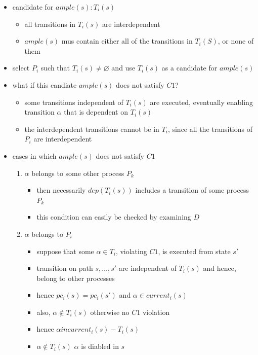 \documentclass[a4paper, 10pt]{article}
\begin{document}
\begin{itemize}
     \item candidate for $ample(s): T_i(s)$
    \begin{itemize}
        \item all transitions in $T_i(s)$ are interdependent
        \item $ample(s)$ mus contain either all of the transitions in $T_i(S)$, or none of them
    \end{itemize}
    \item select $P_i$ such that $T_i(s)\not=\varnothing$ and use $T_i(s)$ as a candidate for $ample(s)$
    \item what if this candiate $ample(s)$ does not satisfy $C1$?
    \begin{itemize}
        \item some transitions independent of $T_i(s)$ are executed, eventually enabling transition $\alpha$ that is dependent on $T_i(s)$
        \item the interdependent transitions cannot be in $T_i$, since all the transitions of $P_i$ are interdependent
    \end{itemize}
    \item cases in which $ample(s)$ does not satisfy $C1$
    \begin{enumerate}
        \item $\alpha$ belongs to some other process $P_k$
        \begin{itemize}
            \item then necessarily $dep(T_i(s))$ includes a transition of some process $P_k$
            \item this condition can easily be checked by examining $D$
        \end{itemize}
        \item $\alpha$ belongs to $P_i$
        \begin{itemize}
            \item suppose that some $\alpha\in T_i$, violating $C1$, is executed from state $s'$
            \item transition on path $s,\dots,s'$ are independent of $T_i(s)$ and hence, belong to other processes
            \item hence $pc_i(s)=pc_i(s')$ and $\alpha\in current_i(s)$
            \item also, $\alpha\not\in T_i(s)$ otherwise no $C1$ violation
            \item hence $\alpha in current_i(s)-T_i(s)$
            \item $\alpha\not\in T_i(s)$ \follows $\alpha$ is diabled in $s$

\end{itemize}
\end{enumerate}
\end{itemize}
\end{document}
